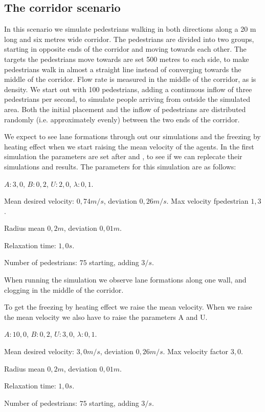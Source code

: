 \subsection{The corridor scenario}
In this scenario we simulate pedestrians walking in both directions along a 20 
m long and six metres wide corridor. The pedestrians are divided into two 
groups, starting in opposite ends of the corridor and moving towards each 
other. The targets the pedestrians move towards are set 500 metres to each 
side, to make pedestrians walk in almost a straight line instead of converging 
towards the middle of the corridor. Flow rate is measured in the middle of the 
corridor, as is density. We start out with 100 pedestrians, adding a 
continuous inflow of three pedestrians per second, to simulate people arriving 
from outside the simulated area. Both the initial placement and the inflow of 
pedestrians are distributed randomly (i.e. approximately evenly) between the 
two ends of the corridor.

We expect to see lane formations through out our simulations
and the freezing by heating effect when we start raising the mean velocity
of the agents.
In the first simulation the parameters are set after \cite{ABconstant} and
\cite{self-org}, to see if we can replecate their simulations and results.
The parameters for this simulation are as follows:

\begin{itemize*}
    \item $A: 3,0$, $B: 0,2$, $U: 2,0$, $\lambda: 0,1$.
    \item Mean desired velocity: $0,74 m/s$, deviation $0,26 m/s$. Max 
        velocity fpedestrian $1,3$.
    \item Radius mean $0,2 m$, deviation $0,01 m$.
    \item Relaxation time: $1,0 s$.
    \item Number of pedestrians: $75$ starting, adding $3/s$.
\end{itemize*}

When running the simulation we observe lane formations along one wall, and clogging
in the middle of the corridor.

To get the freezing by heating effect we raise the mean velocity. 
When we raise the mean velocity we also have to raise the parameters A and U.

\begin{itemize*}
    \item $A: 10,0$, $B: 0,2$, $U: 3,0$, $\lambda: 0,1$.
    \item Mean desired velocity: $3,0 m/s$, deviation $0,26 m/s$. Max 
        velocity factor $3,0$.
    \item Radius mean $0,2 m$, deviation $0,01 m$.
    \item Relaxation time: $1,0 s$.
    \item Number of pedestrians: $75$ starting, adding $3/s$.
\end{itemize*}

